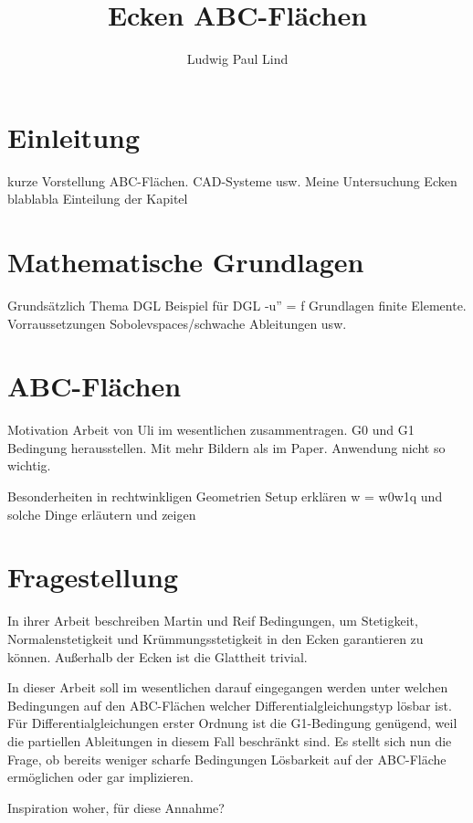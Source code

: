 \documentclass[10pt,a4paper,oneside]{report}
\author{Ludwig Paul Lind}
\title{Ecken ABC-Flächen}
\begin{document}
\maketitle
\tableofcontents

\chapter{Einleitung}
kurze Vorstellung ABC-Flächen. CAD-Systeme usw. 
Meine Untersuchung Ecken blablabla
Einteilung der Kapitel

\chapter{Mathematische Grundlagen}
Grundsätzlich Thema DGL
Beispiel für DGL -u'' = f
Grundlagen finite Elemente.
Vorraussetzungen
Sobolevspaces/schwache Ableitungen usw.

\chapter{ABC-Flächen}
Motivation
Arbeit von Uli im wesentlichen zusammentragen.
G0 und G1 Bedingung herausstellen. 
Mit mehr Bildern als im Paper.
Anwendung nicht so wichtig.

Besonderheiten in rechtwinkligen Geometrien
Setup erklären
w = w0w1q und solche Dinge erläutern und zeigen

\chapter{Fragestellung}
In ihrer Arbeit beschreiben Martin und Reif Bedingungen, um Stetigkeit, Normalenstetigkeit und Krümmungsstetigkeit in den Ecken garantieren zu können.
Außerhalb der Ecken ist die Glattheit trivial.

In dieser Arbeit soll im wesentlichen darauf eingegangen werden unter welchen Bedingungen auf den ABC-Flächen welcher Differentialgleichungstyp lösbar ist.
Für Differentialgleichungen erster Ordnung ist die G1-Bedingung genügend, weil die partiellen Ableitungen in diesem Fall beschränkt sind.
Es stellt sich nun die Frage, ob bereits weniger scharfe Bedingungen Lösbarkeit auf der ABC-Fläche ermöglichen oder gar implizieren.

Inspiration woher, für diese Annahme?
\end{document}
